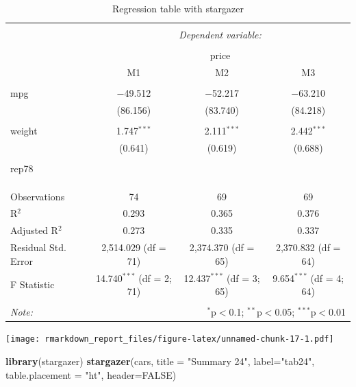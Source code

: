 \documentclass[
  12pt,
]{article}
\newenvironment{Shaded}{\begin{snugshade}}{\end{snugshade}}
\newcommand{\DataTypeTok}[1]{\textcolor[rgb]{0.13,0.29,0.53}{#1}}
\newcommand{\KeywordTok}[1]{\textcolor[rgb]{0.13,0.29,0.53}{\textbf{#1}}}
\newcommand{\NormalTok}[1]{#1}
\newcommand{\OtherTok}[1]{\textcolor[rgb]{0.56,0.35,0.01}{#1}}
\newcommand{\StringTok}[1]{\textcolor[rgb]{0.31,0.60,0.02}{#1}}
\begin{document}
\begin{table}[ht] \centering 
  \caption{Regression table with stargazer} 
  \label{tab3} 
\begin{tabular}{@{\extracolsep{5pt}}lccc} 
\\[-1.8ex]\hline 
\hline \\[-1.8ex] 
 & \multicolumn{3}{c}{\textit{Dependent variable:}} \\ 
\cline{2-4} 
\\[-1.8ex] & \multicolumn{3}{c}{price} \\ 
 & M1 & M2 & M3 \\ 
\hline \\[-1.8ex] 
 mpg & $-$49.512 & $-$52.217 & $-$63.210 \\ 
  & (86.156) & (83.740) & (84.218) \\ 
  & & & \\ 
 weight & 1.747$^{***}$ & 2.111$^{***}$ & 2.442$^{***}$ \\ 
  & (0.641) & (0.619) & (0.688) \\ 
  & & & \\ 
 rep78 &  &  &  \\ 
  &  &  &  \\ 
  & & & \\ 
\hline \\[-1.8ex] 
Observations & 74 & 69 & 69 \\ 
R$^{2}$ & 0.293 & 0.365 & 0.376 \\ 
Adjusted R$^{2}$ & 0.273 & 0.335 & 0.337 \\ 
Residual Std. Error & 2,514.029 (df = 71) & 2,374.370 (df = 65) & 2,370.832 (df = 64) \\ 
F Statistic & 14.740$^{***}$ (df = 2; 71) & 12.437$^{***}$ (df = 3; 65) & 9.654$^{***}$ (df = 4; 64) \\ 
\hline 
\hline \\[-1.8ex] 
\textit{Note:}  & \multicolumn{3}{r}{$^{*}$p$<$0.1; $^{**}$p$<$0.05; $^{***}$p$<$0.01} \\ 
\end{tabular} 
\end{table}

\texttt{[image: rmarkdown\_report\_files/figure-latex/unnamed-chunk-17-1.pdf]}

\begin{Shaded}
\begin{Highlighting}[]
\KeywordTok{library}\NormalTok{(stargazer)}
\KeywordTok{stargazer}\NormalTok{(cars, }
          \DataTypeTok{title =} \StringTok{"Summary 24"}\NormalTok{,}
          \DataTypeTok{label=}\StringTok{"tab24"}\NormalTok{, }
          \DataTypeTok{table.placement =} \StringTok{"ht"}\NormalTok{, }
          \DataTypeTok{header=}\OtherTok{FALSE}\NormalTok{)}
\end{Highlighting}
\end{Shaded}
\end{document}
